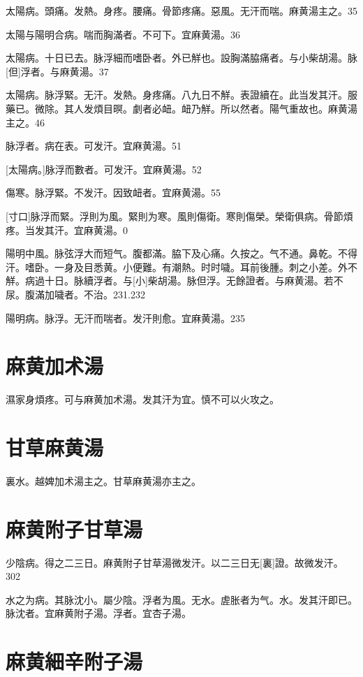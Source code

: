 \documentclass[12pt,twoside,UTF8,b5paper]{ctexbook}
\begin{document}
太陽病。頭痛。发熱。身疼。腰痛。骨節疼痛。惡風。无汗而喘。麻黄湯主之。35

太陽与陽明合病。喘而胸滿者。不可下。宜麻黄湯。36

太陽病。十日已去。脉浮細而嗜卧者。外已觧也。設胸滿脇痛者。与小柴胡湯。脉[但]浮者。与麻黄湯。37

太陽病。脉浮緊。无汗。发熱。身疼痛。八九日不觧。表證續在。此当发其汗。服藥已。微除。其人发煩目暝。劇者必衄。衄乃觧。所以然者。陽气重故也。麻黄湯主之。46

脉浮者。病在表。可发汗。宜麻黄湯。51

[太陽病。]脉浮而數者。可发汗。宜麻黄湯。52

傷寒。脉浮緊。不发汗。因致衄者。宜麻黄湯。55

[寸口]脉浮而緊。浮則为風。緊則为寒。風則傷衛。寒則傷榮。榮衛俱病。骨節煩疼。当发其汗。宜麻黄湯。0

陽明中風。脉弦浮大而短气。腹都滿。脇下及心痛。久按之。气不通。鼻乾。不得汗。嗜卧。一身及目悉黄。小便難。有潮熱。时时噦。耳前後腫。刺之小差。外不觧。病過十日。脉續浮者。与[小]柴胡湯。脉但浮。无餘證者。与麻黄湯。若不尿。腹滿加噦者。不治。231.232

陽明病。脉浮。无汗而喘者。发汗則愈。宜麻黄湯。235

\section{麻黄加术湯}

濕家身煩疼。可与麻黄加术湯。发其汗为宜。慎不可以火攻之。

\section{甘草麻黄湯}

裏水。越婢加术湯主之。甘草麻黄湯亦主之。

\section{麻黄附子甘草湯}

少陰病。得之二三日。麻黄附子甘草湯微发汗。以二三日无[裏]證。故微发汗。302

水之为病。其脉沈小。屬少陰。浮者为風。无水。虗胀者为气。水。发其汗即已。脉沈者。宜麻黄附子湯。浮者。宜杏子湯。

\section{麻黄細辛附子湯}
\end{document}
